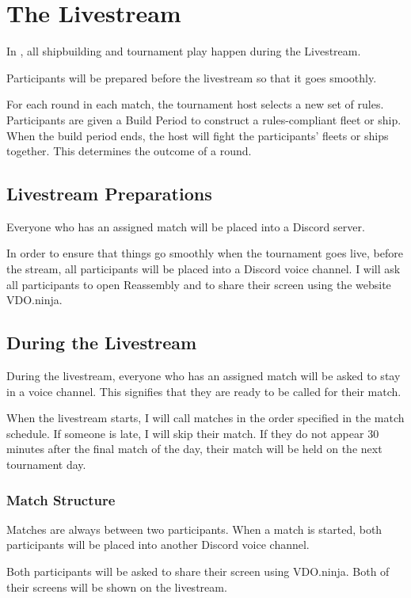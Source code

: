\documentclass[11pt,letterpaper]{article}
\begin{document}
\section{The Livestream}
In \RTL{}, all shipbuilding and tournament play happen during the Livestream.

Participants will be prepared before the livestream so that it goes smoothly.

For each round in each match, the tournament host selects a new set of rules. Participants are
given a Build Period to construct a rules-compliant fleet or ship. When the build period ends,
the host will fight the participants' fleets or ships together. This determines the outcome of
a round.

\subsection{Livestream Preparations}
Everyone who has an assigned match will be placed into a Discord server. 

In order to ensure that things go smoothly when the tournament goes live, before the stream, 
all participants will be placed into a Discord voice channel. I will ask all participants to open 
Reassembly and to share their screen using the website VDO.ninja.

\subsection{During the Livestream}
During the livestream, everyone who has an assigned match will be asked to stay in a voice
channel. This signifies that they are ready to be called for their match. 

When the livestream starts, I will call matches in the order specified in the match schedule.
If someone is late, I will skip their match. If they do not appear
30 minutes after the final match of the day, their match will be held on the next tournament day.

\subsubsection{Match Structure}
Matches are always between two participants.
When a match is started, both participants will be placed into another Discord voice channel.

Both participants will be asked to share their screen using VDO.ninja. Both of their screens 
will be shown on the livestream.
\end{document}
